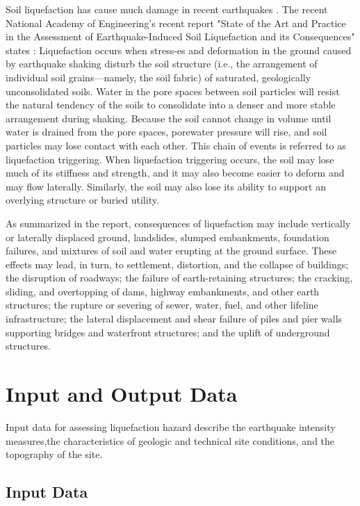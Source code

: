 Soil liquefaction has cause much damage in recent earthquakes \citep[e.g.][]{cubrinovski2011geotechnical,cubrinovski2017liquefaction,bray2017new}. The recent National Academy of Engineering’s recent report "State of the Art and Practice in the Assessment of Earthquake-Induced Soil Liquefaction and its Consequences" states \citep{national2016state}: Liquefaction occurs when stress-es and deformation in the ground caused by earthquake shaking disturb the soil structure (i.e., the arrangement of individual soil grains—namely, the soil fabric) of saturated, geologically unconsolidated soils. Water in the pore spaces between soil particles will resist the natural tendency of the soils to consolidate into a denser and more stable arrangement during shaking. Because the soil cannot change in volume until water is drained from the pore spaces, porewater pressure will rise, and soil particles may lose contact with each other. This chain of events is referred to as liquefaction triggering. When liquefaction triggering occurs, the soil may lose much of its stiffness and strength, and it may also become easier to deform and may flow laterally. Similarly, the soil may also lose its ability to support an overlying structure or buried utility. 

As summarized in the \cite{national2016state} report, consequences of liquefaction may include vertically or laterally displaced ground, landslides, slumped embankments, foundation failures, and mixtures of soil and water erupting at the ground surface. These effects may lead, in turn, to settlement, distortion, and the collapse of buildings; the disruption of roadways; the failure of earth-retaining structures; the cracking, sliding, and overtopping of dams, highway embankments, and other earth structures; the rupture or severing of sewer, water, fuel, and other lifeline infrastructure; the lateral displacement and shear failure of piles and pier walls supporting bridges and waterfront structures; and the uplift of underground structures.

\section{Input and Output Data}

Input data for assessing liquefaction hazard describe the earthquake intensity measures,the characteristics of geologic and technical site conditions, and the topography of the site.

\subsection{Input Data}
\label{subsec:eq_liquefaction_input}

